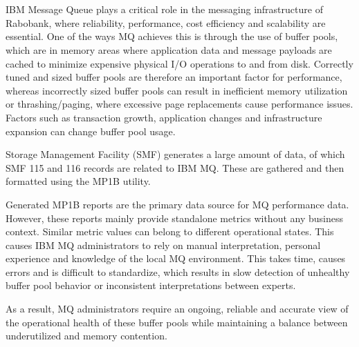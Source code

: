 
\chapter{}%
\label{ch:inleiding}

\section{}%
\label{sec:context}

IBM Message Queue plays a critical role in the messaging infrastructure of Rabobank, where reliability, performance, cost efficiency and scalability are essential. One of the ways MQ achieves this is through the use of buffer pools, which are in memory areas where application data and message payloads are cached to minimize expensive physical I/O operations to and from disk. Correctly tuned and sized buffer pools are therefore an important factor for performance, whereas incorrectly sized buffer pools can result in inefficient memory utilization or thrashing/paging, where excessive page replacements cause performance issues. Factors such as transaction growth, application changes and infrastructure expansion can change buffer pool usage. 

Storage Management Facility (SMF) generates a large amount of data, of which SMF 115 and 116 records are related to IBM MQ. These are gathered and then formatted using the MP1B utility. 

Generated MP1B reports are the primary data source for MQ performance data. However, these reports mainly provide standalone metrics without any business context. Similar metric values can belong to different operational states. This causes IBM MQ administrators to rely on manual interpretation, personal experience and knowledge of the local MQ environment. This takes time, causes errors and is difficult to standardize, which results in slow detection of unhealthy buffer pool behavior or inconsistent interpretations between experts.

As a result, MQ administrators require an ongoing, reliable and accurate view of the operational health of these buffer pools while maintaining a balance between underutilized and memory contention.

